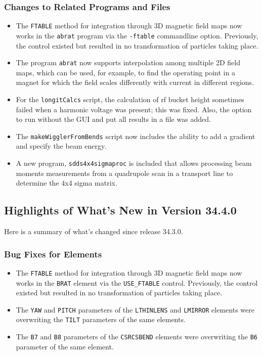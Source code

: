 \documentclass[11pt]{article}
\begin{document}
\subsubsection{Changes to Related Programs and Files}

\begin{itemize}
\item The \verb|FTABLE| method for integration through 3D magnetic field maps now works in the \verb|abrat|
  program via the \verb|-ftable| commandline option. Previously, the control existed but resulted in no transformation
  of particles taking place.
\item The program \verb|abrat| now supports interpolation among multiple 2D field maps, which
  can be used, for example, to find the operating point in a magnet for which the field scales differently with
  current in different regions.
\item For the \verb|longitCalcs| script, the calculation of rf bucket height sometimes failed when a harmonic voltage
  was present; this was fixed. Also, the option to run without the GUI and put all results in a file was added.
\item The \verb|makeWigglerFromBends| script now includes the ability to add a gradient and specify the beam energy.
\item A new program, \verb|sdds4x4sigmaproc| is included that allows processing beam moments measurements from a
  quadrupole scan in a transport line to determine the 4x4 sigma matrix. 
\end{itemize}


\subsection{Highlights of What's New in Version 34.4.0}

Here is a summary of what's changed since release 34.3.0.

\subsubsection{Bug Fixes for Elements}

\begin{itemize}
\item The \verb|FTABLE| method for integration through 3D magnetic field maps now works in the \verb|BRAT|
  element via the \verb|USE_FTABLE| control. Previously, the control existed but resulted in no transformation
  of particles taking place.
\item The \verb|YAW| and \verb|PITCH| parameters of the \verb|LTHINLENS| and \verb|LMIRROR| elements were overwriting
  the \verb|TILT| parameters of the same elements. 
\item The \verb|B7| and \verb|B8| parameters of the \verb|CSRCSBEND| elements were overwriting the \verb|B6| parameter
  of the same element.
\end{itemize}
\end{document}
